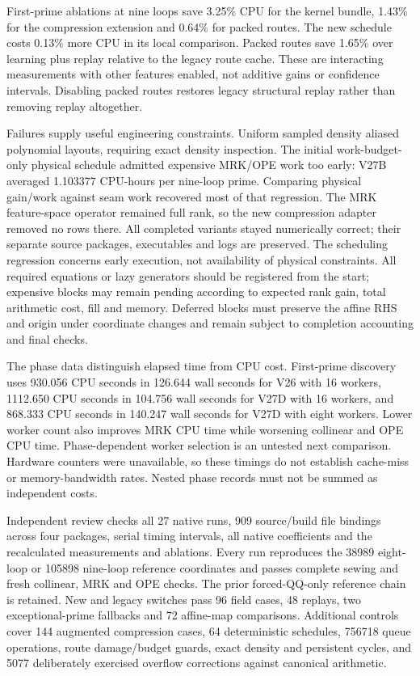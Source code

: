\documentclass[11pt]{article}
\begin{document}
First-prime ablations at nine loops save 3.25\% CPU for the kernel bundle,
1.43\% for the compression extension and 0.64\% for packed routes. The new
schedule costs 0.13\% more CPU in its local comparison. Packed routes save
1.65\% over learning plus replay relative to the legacy route cache.
These are interacting measurements with other features enabled, not additive
gains or confidence intervals. Disabling packed routes restores legacy
structural replay rather than removing replay altogether.

Failures supply useful engineering constraints. Uniform sampled density
aliased polynomial layouts, requiring exact density inspection. The initial
work-budget-only physical schedule admitted expensive MRK/OPE work too
early: V27B averaged 1.103377 CPU-hours per nine-loop prime. Comparing
physical gain/work against seam work recovered most of that regression.
The MRK feature-space operator remained full rank, so the new compression
adapter removed no rows there. All completed variants stayed numerically
correct; their separate source packages, executables and logs are preserved.
The scheduling regression concerns early execution, not availability of
physical constraints. All required equations or lazy generators should be
registered from the start; expensive blocks may remain pending according
to expected rank gain, total arithmetic cost, fill and memory. Deferred
blocks must preserve the affine RHS and origin under coordinate changes
and remain subject to completion accounting and final checks.

The phase data distinguish elapsed time from CPU cost. First-prime discovery
uses 930.056 CPU seconds in 126.644 wall seconds for V26 with 16 workers,
1112.650 CPU seconds in 104.756 wall seconds for V27D with 16 workers, and
868.333 CPU seconds in 140.247 wall seconds for V27D with eight workers.
Lower worker count also improves MRK CPU time while worsening collinear
and OPE CPU time. Phase-dependent worker selection is an untested next
comparison. Hardware counters were unavailable, so these timings do not
establish cache-miss or memory-bandwidth rates. Nested phase records must
not be summed as independent costs.

Independent review checks all 27 native runs, 909 source/build file bindings
across four packages, serial timing intervals, all native coefficients and
the recalculated measurements and ablations. Every run reproduces the
38989 eight-loop or 105898 nine-loop reference coordinates and passes
complete sewing and fresh collinear, MRK and OPE checks. The prior
forced-QQ-only reference chain is retained. New and legacy switches pass
96 field cases, 48 replays, two exceptional-prime fallbacks and 72 affine-map
comparisons. Additional controls cover 144 augmented compression cases,
64 deterministic schedules, 756718 queue operations, route damage/budget
guards, exact density and persistent cycles, and 5077 deliberately exercised
overflow corrections against canonical arithmetic.
\end{document}
